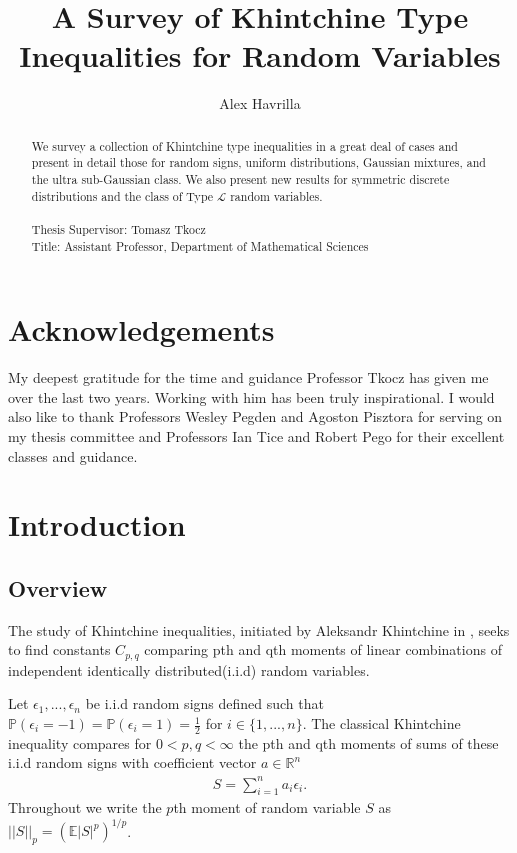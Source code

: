 \documentclass[10pt]{article}
\title{\vspace{-3em}A Survey of Khintchine Type Inequalities for Random Variables}
\author{Alex Havrilla}
\newcommand{\Pp}{\mathbb{P}}
\newcommand{\E}{\mathbb{E}}
\newcommand{\1}{\textbf{1}}
\newcommand{\R}{\mathbb{R}}
\newcommand{\norm}[1]{\left\lvert\left\lvert#1\right\rvert\right\rvert}
\newcommand{\normOne}[1]{\left\lvert#1\right\rvert}
\newcommand{\lparen}{\left(}
\newcommand{\rparen}{\right)}
\theoremstyle{remark}
\theoremstyle{definition}
\begin{document}
\maketitle

\begin{abstract}
	We survey a collection of Khintchine type inequalities in a great deal of cases and present in detail those for random signs, uniform distributions, Gaussian mixtures, and the ultra sub-Gaussian class. We also present new results for symmetric discrete distributions and the class of Type $\mathcal{L}$ random variables. \\ \\ Thesis Supervisor: Tomasz Tkocz \\ Title: Assistant Professor, Department of Mathematical Sciences
\end{abstract}



\newpage

\section*{Acknowledgements}

My deepest gratitude for the time and guidance Professor Tkocz has given me over the last two
 years. Working with him has been truly inspirational. I would also like to thank Professors Wesley Pegden and Agoston Pisztora for serving on my thesis committee and Professors Ian Tice and Robert Pego for their excellent classes and guidance. 

\newpage

\tableofcontents

\newpage

\section{Introduction} 

\subsection{Overview}

The study of Khintchine inequalities, initiated by Aleksandr Khintchine in \cite{K}, seeks to find constants $C_{p,q}$ comparing pth and qth moments of linear combinations of independent identically distributed(i.i.d) random variables. 

Let $\epsilon_1,...,\epsilon_n$ be i.i.d random signs defined such that $\Pp(\epsilon_i = -1) = \Pp(\epsilon_i = 1) = \frac{1}{2}$ for $i \in \{1,...,n\}$. The classical Khintchine inequality compares for $0 < p,q < \infty$ the pth and qth moments of sums of these i.i.d random signs with coefficient vector $a \in \R^n$
\begin{align*}
	S = \sum_{i=1}^n a_i \epsilon_i.
\end{align*} Throughout we write the $p$th moment of random variable $S$ as $\norm{S}_p = \lparen\E\normOne{S}^p\rparen^{1/p}$.
\end{document}
